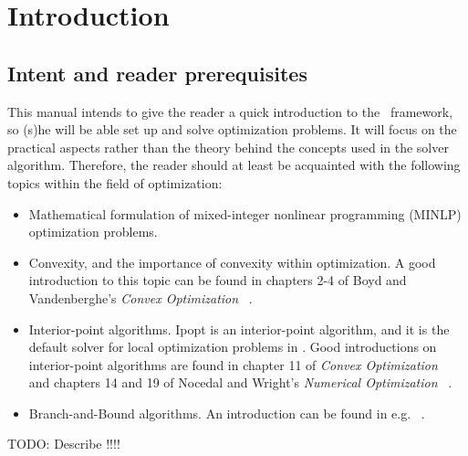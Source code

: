\section{Introduction}\label{sec:introduction}
\subsection{Intent and reader prerequisites}
This manual intends to give the reader a quick introduction to the \solvername\ framework, so (s)he will be able set up and solve optimization problems. It will focus on the practical aspects rather than the theory behind the concepts used in the solver algorithm. Therefore, the reader should at least be acquainted with the following topics within the field of optimization:
\begin{itemize}
\item
Mathematical formulation of mixed-integer nonlinear programming (MINLP) optimization problems.
\item
Convexity, and the importance of convexity within optimization. A good introduction to this topic can be found in chapters 2-4 of Boyd and Vandenberghe's \emph{Convex Optimization} ~\cite{Boyd:2004:CO:993483}.
\item
Interior-point algorithms. Ipopt is an interior-point algorithm, and it is the default solver for local optimization problems in \solvername. Good introductions on interior-point algorithms are found in chapter 11 of \emph{Convex Optimization} ~\cite{Boyd:2004:CO:993483} and chapters 14 and 19 of Nocedal and Wright's \emph{Numerical Optimization} ~\cite{Nocedal99}.
\item
Branch-and-Bound algorithms. An introduction can be found in e.g.  ~\cite{clausen1999branch}.
\end{itemize}
{\color{red} TODO: Describe \solvername!!!!}
